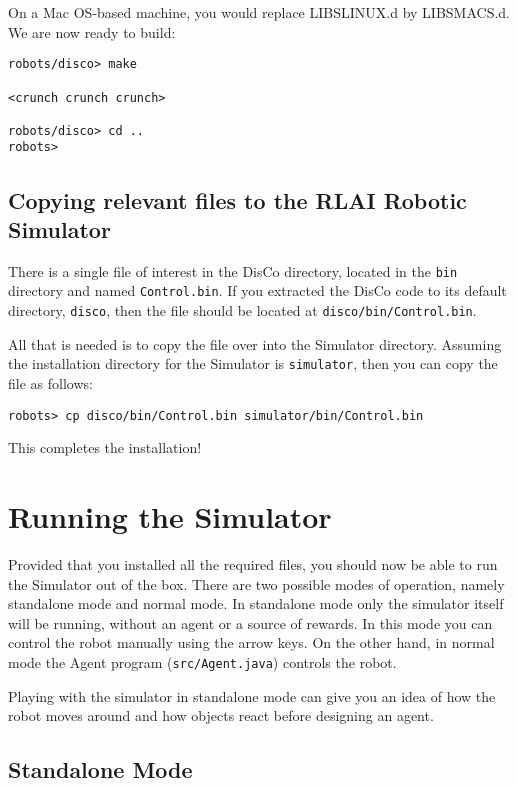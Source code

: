 \documentclass[12pt]{article}
\begin{document}
On a Mac OS-based machine, you would replace LIBSLINUX.d by LIBSMACS.d. We 
are now ready to build:

\begin{verbatim}
robots/disco> make

<crunch crunch crunch>

robots/disco> cd ..
robots>
\end{verbatim}


\subsection{Copying relevant files to the RLAI Robotic Simulator}

There is a single file of interest in the DisCo directory, located in the
\verb+bin+ directory and named \verb+Control.bin+. If you extracted the 
DisCo code to its default directory, \verb+disco+, then the file should 
be located at \verb+disco/bin/Control.bin+.

All that is needed is to copy the file over into the Simulator directory.
Assuming the installation directory for the Simulator is \verb+simulator+,
then you can copy the file as follows:

\begin{verbatim}
robots> cp disco/bin/Control.bin simulator/bin/Control.bin
\end{verbatim}

This completes the installation! 

\section{Running the Simulator}

Provided that you installed all the required files, you should now be able to
run the Simulator out of the box. There are two possible modes of operation,
namely standalone mode and normal mode. In standalone mode only the simulator
itself will be running, without an agent or a source of rewards. In this mode
you can control the robot manually using the arrow keys. On the other hand,
in normal mode the Agent program (\verb+src/Agent.java+) controls the robot.

Playing with the simulator in standalone mode can give you an idea of how the
robot moves around and how objects react before designing an agent.

\subsection{Standalone Mode}\label{subsec:standalone}
\end{document}
